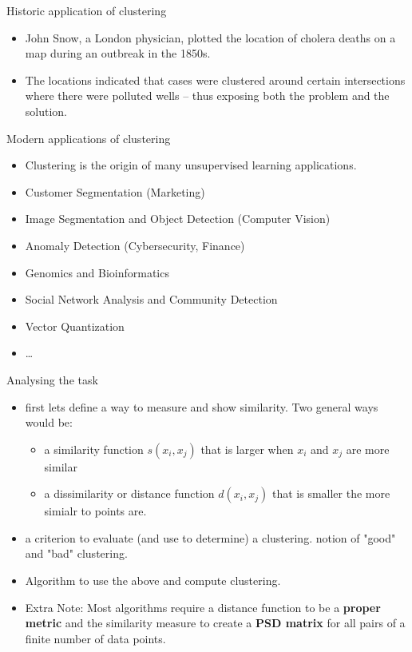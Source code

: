 \documentclass[serif, aspectratio=169]{beamer}
\begin{document}
\begin{frame}{Historic application of clustering}
\begin{itemize}
    \item John Snow, a London physician, plotted the location of cholera deaths on a map during an outbreak in the 1850s.
    \item The locations indicated that cases were clustered around certain intersections where there were polluted wells -- thus exposing both the problem and the solution.
\end{itemize}
    

\end{frame}

\begin{frame}{Modern applications of clustering}
\begin{itemize}
    \item Clustering is the origin of many unsupervised learning applications.
    \item Customer Segmentation (Marketing)
    \item Image Segmentation and Object Detection (Computer Vision)
    \item Anomaly Detection (Cybersecurity, Finance)
    \item Genomics and Bioinformatics
    \item Social Network Analysis and Community Detection
    \item Vector Quantization
    \item \dots
\end{itemize}
    

\end{frame}


\begin{frame}{Analysing the task}
\begin{itemize}
    \item first lets define a way to measure and show similarity. Two general ways would be:
    \begin{itemize}
        \item a similarity function $s(x_i,x_j)$ that is larger when $x_i$ and $x_j$ are more similar
        \item a dissimilarity or distance function $d(x_i,x_j)$ that is smaller the more simialr to points are.

    \end{itemize}
\item  a criterion to evaluate (and use to determine) a clustering. notion of "good" and "bad" clustering.
\item Algorithm to use the above and compute clustering.

            \item Extra Note: Most algorithms require a distance function to be a \textbf{proper metric} and the similarity measure to create a \textbf{PSD matrix} for all pairs of a finite number of data points.
\end{itemize}

    
\end{frame}
\end{document}
